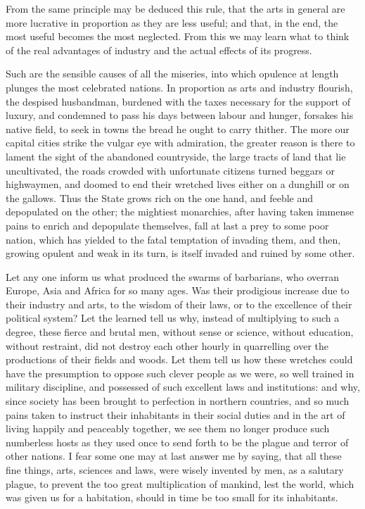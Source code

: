 \documentclass[12pt]{report}
\begin{document}
From the same principle may be deduced this rule, that the arts in general are more lucrative in proportion as they are less useful; and that, in the end, the most useful becomes the most neglected. From this we may learn what to think of the real advantages of industry and the actual effects of its progress.

Such are the sensible causes of all the miseries, into which opulence at length plunges the most celebrated nations. In proportion as arts and industry flourish, the despised husbandman, burdened with the taxes necessary for the support of luxury, and condemned to pass his days between labour and hunger, forsakes his native field, to seek in towns the bread he ought to carry thither. The more our capital cities strike the vulgar eye with admiration, the greater reason is there to lament the sight of the abandoned countryside, the large tracts of land that lie uncultivated, the roads crowded with unfortunate citizens turned beggars or highwaymen, and doomed to end their wretched lives either on a dunghill or on the gallows. Thus the State grows rich on the one hand, and feeble and depopulated on the other; the mightiest monarchies, after having taken immense pains to enrich and depopulate themselves, fall at last a prey to some poor nation, which has yielded to the fatal temptation of invading them, and then, growing opulent and weak in its turn, is itself invaded and ruined by some other.

Let any one inform us what produced the swarms of barbarians, who overran Europe, Asia and Africa for so many ages. Was their prodigious increase due to their industry and arts, to the wisdom of their laws, or to the excellence of their political system? Let the learned tell us why, instead of multiplying to such a degree, these fierce and brutal men, without sense or science, without education, without restraint, did not destroy each other hourly in quarrelling over the productions of their fields and woods. Let them tell us how these wretches could have the presumption to oppose such clever people as we were, so well trained in military discipline, and possessed of such excellent laws and institutions: and why, since society has been brought to perfection in northern countries, and so much pains taken to instruct their inhabitants in their social duties and in the art of living happily and peaceably together, we see them no longer produce such numberless hosts as they used once to send forth to be the plague and terror of other nations. I fear some one may at last answer me by saying, that all these fine things, arts, sciences and laws, were wisely invented by men, as a salutary plague, to prevent the too great multiplication of mankind, lest the world, which was given us for a habitation, should in time be too small for its inhabitants.
\end{document}
